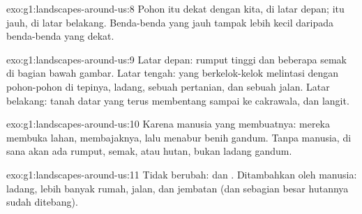 \begin{solution}{exo:g1:landscapes-around-us:8}
Pohon itu dekat dengan kita, di latar depan;  itu jauh, di latar
belakang. Benda-benda yang jauh tampak lebih kecil daripada benda-benda
yang dekat.
\end{solution}

\begin{solution}{exo:g1:landscapes-around-us:9}
Latar depan: rumput tinggi dan beberapa semak di bagian bawah gambar.
Latar tengah:  yang berkelok-kelok melintasi  dengan
pohon-pohon di tepinya, ladang, sebuah pertanian, dan sebuah jalan.
Latar belakang: tanah datar yang terus membentang sampai ke cakrawala, dan
langit.
\end{solution}

\begin{solution}{exo:g1:landscapes-around-us:10}
Karena manusia yang membuatnya: mereka membuka lahan, membajaknya, lalu
menabur benih gandum. Tanpa manusia, di sana akan ada rumput, semak, atau
hutan, bukan ladang gandum.
\end{solution}

\begin{solution}{exo:g1:landscapes-around-us:11}
Tidak berubah:  dan . Ditambahkan oleh manusia: ladang, lebih
banyak rumah, jalan, dan jembatan (dan sebagian besar hutannya sudah
ditebang).
\end{solution}
